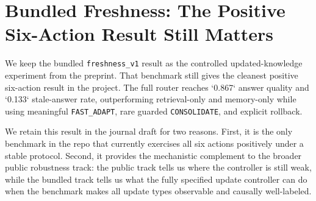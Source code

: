 \section{Bundled Freshness: The Positive Six-Action Result Still Matters}

We keep the bundled \texttt{freshness\_v1} result as the controlled updated-knowledge experiment from the preprint. That benchmark still gives the cleanest positive six-action result in the project. The full router reaches `0.867` answer quality and `0.133` stale-answer rate, outperforming retrieval-only and memory-only while using meaningful \texttt{FAST\_ADAPT}, rare guarded \texttt{CONSOLIDATE}, and explicit rollback.

We retain this result in the journal draft for two reasons. First, it is the only benchmark in the repo that currently exercises all six actions positively under a stable protocol. Second, it provides the mechanistic complement to the broader public robustness track: the public track tells us where the controller is still weak, while the bundled track tells us what the fully specified update controller can do when the benchmark makes all update types observable and causally well-labeled.
